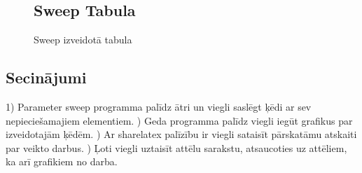 \documentclass{report}
\begin{document}
\newpage
\begin{figure}
\subsection{Sweep Tabula}
\caption{Sweep izveidotā tabula}
\end{figure}




\newpage
\subsection{Secinājumi}
1) Parameter sweep programma palīdz ātri un viegli saslēgt ķēdi ar sev nepieciešamajiem elementiem.
\vspace{5mm}
) Geda programma palīdz viegli iegūt grafikus par izveidotajām ķēdēm.
\vspace{5mm}
) Ar sharelatex palīzību ir viegli sataisīt pārskatāmu atskaiti par veikto darbus.
\vspace{5mm}
) Ļoti viegli uztaisīt attēlu sarakstu, atsaucoties uz attēliem, ka arī grafikiem no darba.


\listoffigures
\end{document}
